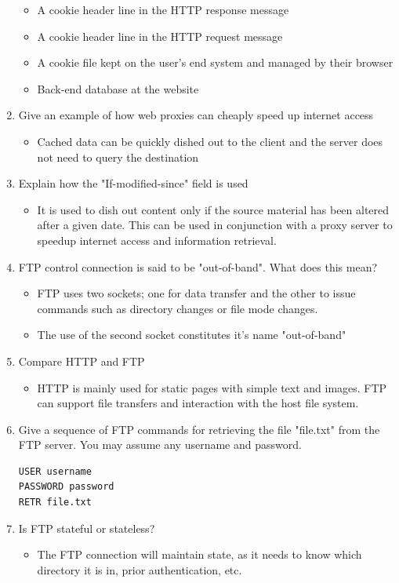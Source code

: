 \documentclass{article}
\begin{document}
\begin{enumerate}
\begin{itemize}
\item A cookie header line in the HTTP response message
\item A cookie header line in the HTTP request message
\item A cookie file kept on the user's end system and managed by their browser
\item Back-end database at the website
\end{itemize}

\item Give an example of how web proxies can cheaply speed up internet access
\begin{itemize}
\item Cached data can be quickly dished out to the client and the server does not need to query the destination
\end{itemize}

\item Explain how the "If-modified-since" field is used
\begin{itemize}
\item It is used to dish out content only if the source material has been altered after a given date. This can be used in conjunction with a proxy server to speedup internet access and information retrieval.
\end{itemize}

\item FTP control connection is said to be "out-of-band". What does this mean?
\begin{itemize}
\item FTP uses two sockets; one for data transfer and the other to issue commands such as directory changes or file mode changes.
\item The use of the second socket constitutes it's name "out-of-band"
\end{itemize}

\item Compare HTTP and FTP
\begin{itemize}
\item HTTP is mainly used for static pages with simple text and images. FTP can support file transfers and interaction with the host file system.
\end{itemize}

\item Give a sequence of FTP commands for retrieving the file "file.txt" from the FTP server. You may assume any username and password.
\begin{verbatim}
USER username
PASSWORD password
RETR file.txt
\end{verbatim}

\item Is FTP stateful or stateless?
\begin{itemize}
\item The FTP connection will maintain state, as it needs to know which directory it is in, prior authentication, etc.
\end{itemize}
\end{enumerate}
\end{document}
